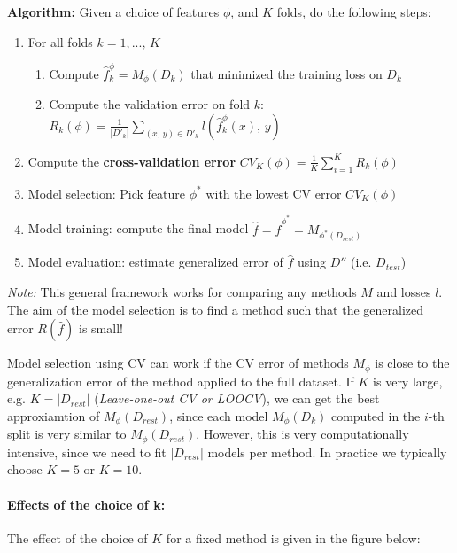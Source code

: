 \documentclass[a4paper]{extarticle}
\begin{document}
\begin{cbox}
    \textbf{Algorithm:} Given a choice of features \(\phi\), and \(K\) folds, do the following steps:
    \begin{enumerate}
        \item For all folds \(k = 1,..., \, K\)
            \begin{enumerate}
                \item Compute \(\hat{f}^{\phi}_k = M_{\phi}(D_k)\) that minimized the training loss on \(D_k\)
                \item Compute the validation error on fold \(k\): \(R_k(\phi) = \frac{1}{|D'_k|} \sum_{(x, \, y) \in D'_k} l(\hat{f}^{\phi}_k (x), \, y)\)
            \end{enumerate}
        \item Compute the \textbf{cross-validation error} \(CV_K(\phi) = \frac{1}{K}\sum_{i = 1}^K R_k(\phi)\)
        \item Model selection: Pick feature \(\phi^*\) with the lowest CV error \(CV_K(\phi)\)
        \item Model training: compute the final model \(\hat{f} = \hat{f}^{\phi^*} = M_{\phi^*(D_{rest})}\)
        \item Model evaluation: estimate generalized error of \(\hat{f}\) using \(D''\) (i.e. \(D_{test}\))
    \end{enumerate}
\end{cbox}

\textit{Note:} This general framework works for comparing any methods \(M\) and losses \(l\). The aim of the model selection is to find a method such that the generalized error \(R(\hat{f})\) is small!

Model selection using CV can work if the CV error of methods \(M_{\phi}\) is close to the generalization error of the method applied to the full dataset. If \(K\) is very large, e.g. \(K = |D_{rest}|\) (\textit{Leave-one-out CV or LOOCV}), we can get the best approxiamtion of \(M_{\phi}(D_{rest})\), since each model \(M_{\phi}(D_k)\) computed in the \(i\)-th split is very similar to \(M_{\phi}(D_{rest})\).
However, this is very computationally intensive, since we need to fit \(|D_{rest}|\) models per method. In practice we typically choose \(K = 5\) or \(K = 10\).

\paragraph{Effects of the choice of k:} The effect of the choice of \(K\) for a fixed method is given in the figure below:
\end{document}
